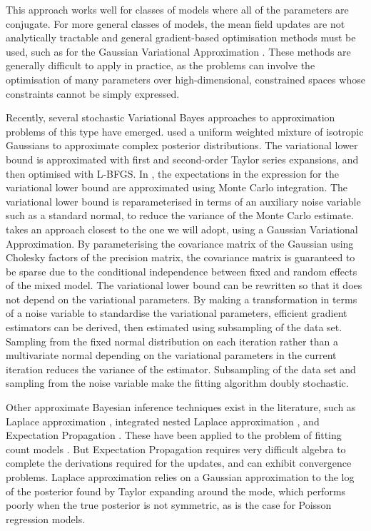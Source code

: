 This approach works well for classes of models where all of the parameters are
conjugate. For more general classes of models, the mean field updates are not
analytically tractable and general gradient-based optimisation methods must be
used, such as for the Gaussian Variational Approximation \citep{Ormerod2012}.
These methods are generally difficult to apply in practice, as the problems can
involve the optimisation of many parameters over high-dimensional, constrained
spaces whose constraints cannot be simply expressed.

Recently, several stochastic Variational Bayes approaches to approximation
problems of this type have emerged.  \cite{Gershman2012} used a uniform
weighted mixture of isotropic Gaussians to approximate complex posterior
distributions. The variational lower bound is approximated with first and
second-order Taylor series expansions, and then optimised with L-BFGS.  In
\cite{Kingma2013}, the expectations in the expression for the variational lower
bound are approximated using Monte Carlo integration. The variational lower
bound is reparameterised in terms of an auxiliary noise variable such as a
standard normal, to reduce the variance of the Monte Carlo estimate.
\cite{Tan2018} takes an approach closest to the one we will adopt, using a
Gaussian Variational Approximation.  By parameterising the covariance matrix of
the Gaussian using Cholesky factors of the precision matrix, the covariance
matrix is guaranteed to be sparse due to the conditional independence between
fixed and random effects of the mixed model. The variational lower bound can be
rewritten so that it does not depend on the variational parameters.  By making
a transformation in terms of a noise variable to standardise the variational
parameters, efficient gradient estimators can be derived, then estimated using
subsampling of the data set. Sampling from the fixed normal distribution on
each iteration rather than a multivariate normal depending on the variational
parameters in the current iteration reduces the variance of the estimator.
Subsampling of the data set and sampling from the noise variable make the
fitting algorithm doubly stochastic.

Other approximate Bayesian inference techniques exist in the literature, such
as Laplace approximation \citep{Tierney1986},   integrated nested Laplace
approximation \citep{Rue2009}, and Expectation Propagation \citep{Minka2013}.
These have been applied to the problem of fitting count models
\citep{Barber2016, KimWand2017}.  But Expectation Propagation requires very
difficult algebra to complete the derivations required for the updates, and can
exhibit convergence problems. Laplace approximation relies on a Gaussian
approximation to the log of the posterior found by Taylor expanding around the
mode, which performs poorly when the true posterior is not symmetric, as is the
case for Poisson regression models.

